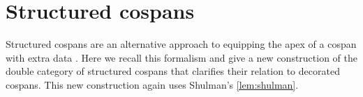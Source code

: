 \documentclass[reqno]{amsart}
\theoremstyle{definition}
\theoremstyle{remark}
\newcommand{\A}{\mathsf{A}}
\newcommand{\inta}{\raisebox{.3\depth}{$\smallint\hspace{-.01in}$}}
\begin{document}
\iffalse
we have a natural isomorphism between $0_{\inta F'}$ and $G(0_{\inta F})$ given by:
\[
\begin{tikzpicture}[scale=1.5]
\node (A) at (-1,0.5) {$\scriptscriptstyle{1}$};
\node () at (4,0.66) {$\scriptscriptstyle{\cong}$};
\node (A1) at (0,0) {$\scriptscriptstyle{E(1)}$};
\node (A2) at (2,0) {$\scriptscriptstyle{E(F(0_\A))}$};
\node (A3) at (4,0) {$\scriptscriptstyle{E(F(0_\A))}$};
\node (A4) at (6,0) {$\scriptscriptstyle{F'(H(0_\A))}$};
\node (A') at (2,0.5) {$\scriptscriptstyle{F'(H(0_\A))}$};
\node (B1) at (0,1) {$\scriptscriptstyle{F'(0_{\A'})}$};
\node (B2) at (6,1) {$\scriptscriptstyle{F'(0_{\A'})}$};
\path[->,font=\scriptsize,>=angle 90]
(A) edge node [below] {$\scriptscriptstyle{E_0}$} (A1)
(A) edge node [above] {$\scriptscriptstyle{\phi_0'}$} (B1)
(A1) edge node [above] {$\scriptscriptstyle{E(\phi_0)}$} (A2)
(A2) edge node [below] {$\scriptscriptstyle{E(F(!_{0_\A}))}$} (A3)
(A3) edge node [below] {$\scriptscriptstyle{\theta_{0_\A}}$} (A4)
(A2) edge node [left] {$\scriptscriptstyle{\theta_{0_\A}}$} (A')
(B1) edge node [fill=white] {$\scriptscriptstyle{F'(H_0)}$} (A')
(A') edge node [fill=white] {$\scriptscriptstyle{F'(H(!_{0_\A}))}$} (A4)
(B2) edge node [right] {$\scriptscriptstyle{F'(H_0)}$} (A4)
(B1) edge node [above] {$\scriptscriptstyle{F'(!_{0_{\A'}})}$} (B2);
\end{tikzpicture}
\]
\fi


\section{Structured cospans} \label{Structured}

Structured cospans are an alternative approach to equipping the apex of a cospan with 
extra data \cite{BC}.    Here we recall this formalism and give a new construction of the double category of structured cospans that clarifies their relation to decorated cospans.   This new construction again uses Shulman's \cref{lem:shulman}.  
\end{document}
